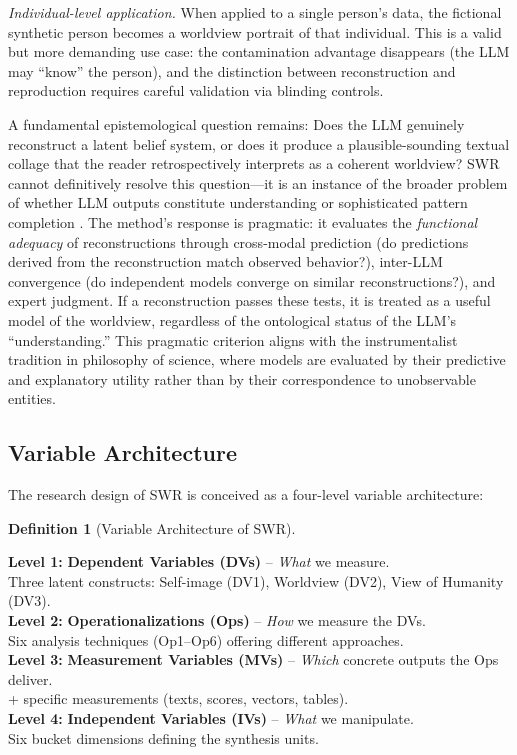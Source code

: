 \documentclass[11pt,a4paper]{article}
\theoremstyle{definition}
\newtheorem{definition}{Definition}[section]
\theoremstyle{plain}
\theoremstyle{remark}
\begin{document}
\emph{Individual-level application.} When applied to a single person's data, the fictional synthetic person becomes a worldview portrait of that individual. This is a valid but more demanding use case: the contamination advantage disappears (the LLM may ``know'' the person), and the distinction between reconstruction and reproduction requires careful validation via blinding controls.

A fundamental epistemological question remains: Does the LLM genuinely reconstruct a latent belief system, or does it produce a plausible-sounding textual collage that the reader retrospectively interprets as a coherent worldview? SWR cannot definitively resolve this question---it is an instance of the broader problem of whether LLM outputs constitute understanding or sophisticated pattern completion \citep{Messeri2024}. The method's response is pragmatic: it evaluates the \emph{functional adequacy} of reconstructions through cross-modal prediction (do predictions derived from the reconstruction match observed behavior?), inter-LLM convergence (do independent models converge on similar reconstructions?), and expert judgment. If a reconstruction passes these tests, it is treated as a useful model of the worldview, regardless of the ontological status of the LLM's ``understanding.'' This pragmatic criterion aligns with the instrumentalist tradition in philosophy of science, where models are evaluated by their predictive and explanatory utility rather than by their correspondence to unobservable entities.


\subsection{Variable Architecture}

The research design of SWR is conceived as a four-level variable architecture:

\begin{definition}[Variable Architecture of SWR]
\label{def:architecture}
\begin{tabbing}
\textbf{Level 1:} \= \textbf{Dependent Variables (DVs)} -- \emph{What} we measure. \\
                   \> Three latent constructs: Self-image (DV1), Worldview (DV2), View of Humanity (DV3). \\[0.5em]
\textbf{Level 2:} \> \textbf{Operationalizations (Ops)} -- \emph{How} we measure the DVs. \\
                   \> Six analysis techniques (Op1--Op6) offering different approaches. \\[0.5em]
\textbf{Level 3:} \> \textbf{Measurement Variables (MVs)} -- \emph{Which} concrete outputs the Ops deliver. \\
                   + specific measurements (texts, scores, vectors, tables). \\[0.5em]
\textbf{Level 4:} \> \textbf{Independent Variables (IVs)} -- \emph{What} we manipulate. \\
                   \> Six bucket dimensions defining the synthesis units.
\end{tabbing}
\end{definition}
\end{document}
